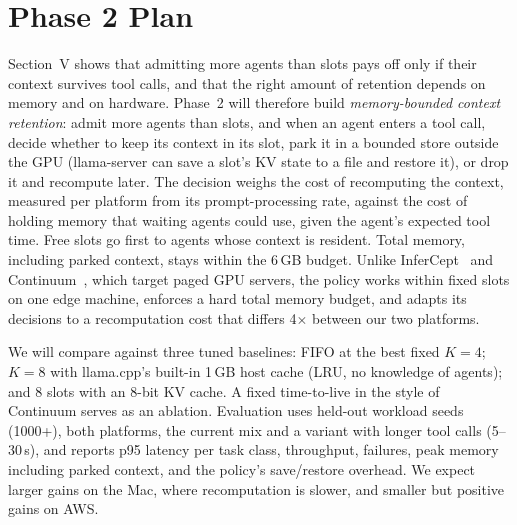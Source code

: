 \documentclass[conference,letterpaper]{IEEEtran}
\begin{document}
\section{Phase 2 Plan}
Section~V shows that admitting more agents than slots pays off only if their context survives tool calls, and that the right amount of retention depends on memory and on hardware. Phase~2 will therefore build \emph{memory-bounded context retention}: admit more agents than slots, and when an agent enters a tool call, decide whether to keep its context in its slot, park it in a bounded store outside the GPU (llama-server can save a slot's KV state to a file and restore it), or drop it and recompute later. The decision weighs the cost of recomputing the context, measured per platform from its prompt-processing rate, against the cost of holding memory that waiting agents could use, given the agent's expected tool time. Free slots go first to agents whose context is resident. Total memory, including parked context, stays within the 6\,GB budget. Unlike InferCept~\cite{abhyankar2024infercept} and Continuum~\cite{li2025continuum}, which target paged GPU servers, the policy works within fixed slots on one edge machine, enforces a hard total memory budget, and adapts its decisions to a recomputation cost that differs 4$\times$ between our two platforms.

We will compare against three tuned baselines: FIFO at the best fixed $K=4$; $K=8$ with llama.cpp's built-in 1\,GB host cache (LRU, no knowledge of agents); and 8 slots with an 8-bit KV cache. A fixed time-to-live in the style of Continuum serves as an ablation. Evaluation uses held-out workload seeds (1000+), both platforms, the current mix and a variant with longer tool calls (5--30\,s), and reports p95 latency per task class, throughput, failures, peak memory including parked context, and the policy's save/restore overhead. We expect larger gains on the Mac, where recomputation is slower, and smaller but positive gains on AWS.



\end{document}
